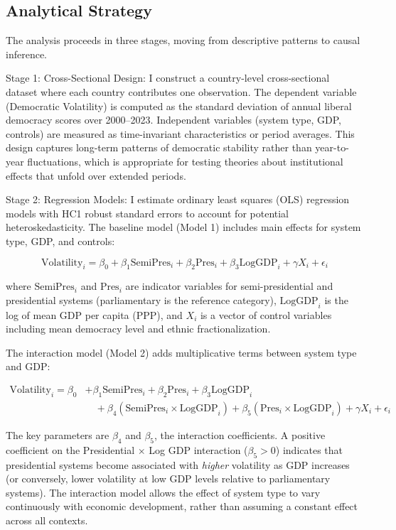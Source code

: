 \documentclass[
  letterpaper,
  DIV=11,
  numbers=noendperiod]{scrartcl}
\begin{document}
\subsection{Analytical Strategy}\label{analytical-strategy}

The analysis proceeds in three stages, moving from descriptive patterns
to causal inference.

Stage 1: Cross-Sectional Design: I construct a country-level
cross-sectional dataset where each country contributes one observation.
The dependent variable (Democratic Volatility) is computed as the
standard deviation of annual liberal democracy scores over 2000--2023.
Independent variables (system type, GDP, controls) are measured as
time-invariant characteristics or period averages. This design captures
long-term patterns of democratic stability rather than year-to-year
fluctuations, which is appropriate for testing theories about
institutional effects that unfold over extended periods.

Stage 2: Regression Models: I estimate ordinary least squares (OLS)
regression models with HC1 robust standard errors to account for
potential heteroskedasticity. The baseline model (Model 1) includes main
effects for system type, GDP, and controls:

\[
\text{Volatility}_i = \beta_0 + \beta_1 \text{SemiPres}_i + \beta_2 \text{Pres}_i + \beta_3 \text{LogGDP}_i + \gamma {X}_i + \epsilon_i
\]

where \(\text{SemiPres}_i\) and \(\text{Pres}_i\) are indicator
variables for semi-presidential and presidential systems (parliamentary
is the reference category), \(\text{LogGDP}_i\) is the log of mean GDP
per capita (PPP), and \(X_i\) is a vector of control variables including
mean democracy level and ethnic fractionalization.

The interaction model (Model 2) adds multiplicative terms between system
type and GDP:

\[
\begin{aligned}
\text{Volatility}_i = \beta_0 &+ \beta_1 \text{SemiPres}_i + \beta_2 \text{Pres}_i + \beta_3 \text{LogGDP}_i \\
&\quad + \beta_4 (\text{SemiPres}_i \times \text{LogGDP}_i) + \beta_5 (\text{Pres}_i \times \text{LogGDP}_i) + \gamma X_i + \epsilon_i
\end{aligned}
\]

The key parameters are \(\beta_4\) and \(\beta_5\), the interaction
coefficients. A positive coefficient on the Presidential \(\times\) Log
GDP interaction (\(\beta_5 > 0\)) indicates that presidential systems
become associated with \emph{higher} volatility as GDP increases (or
conversely, lower volatility at low GDP levels relative to parliamentary
systems). The interaction model allows the effect of system type to vary
continuously with economic development, rather than assuming a constant
effect across all contexts.
\end{document}
